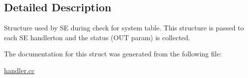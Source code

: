 \subsection{Detailed Description}
Structure used by SE during check for system table. This structure is passed to each SE handlerton and the status (O\+UT param) is collected. 

The documentation for this struct was generated from the following file\+:\begin{DoxyCompactItemize}
\item 
\mbox{\hyperlink{handler_8cc}{handler.\+cc}}\end{DoxyCompactItemize}
